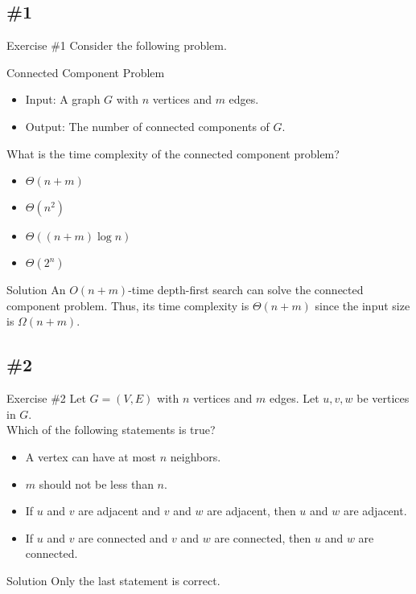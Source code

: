 \documentclass{beamer}
\begin{document}
\subsection{\#1}
\begin{frame}{Exercise \#1}
  Consider the following problem. \pause
  \begin{block}{Connected Component Problem}
    \begin{itemize}
      \item Input: A graph $G$ with $n$ vertices and $m$ edges.
      \item Output: The number of connected components of $G$.
    \end{itemize}
  \end{block}
  \pause
  What is the time complexity of the connected component problem?
  \begin{multicols}{2}
    \begin{itemize}
      \item $\Theta(n + m)$
      \item $\Theta(n^2)$
      \item $\Theta((n + m)\log n)$
      \item $\Theta(2^n)$ \pause
    \end{itemize}
  \end{multicols}
  \begin{block}{Solution}
    An $O(n + m)$-time depth-first search can solve the connected component
    problem.
    Thus, its time complexity is $\Theta(n + m)$ since the input size is
    $\Omega(n + m)$.
  \end{block}
\end{frame}

\subsection{\#2}
\begin{frame}{Exercise \#2}
  Let $G = (V, E)$ with $n$ vertices and $m$ edges.
  Let $u, v, w$ be vertices in $G$. \pause \\
  Which of the following statements is true? \pause
  \begin{itemize}
    \item A vertex can have at most $n$ neighbors. \pause
    \item $m$ should not be less than $n$. \pause
    \item If $u$ and $v$ are adjacent and $v$ and $w$ are adjacent, then
    $u$ and $w$ are adjacent. \pause
    \item If $u$ and $v$ are connected and $v$ and $w$ are connected, then
    $u$ and $w$ are connected. \pause
  \end{itemize}
  \begin{block}{Solution}
    Only the last statement is correct.
  \end{block}
\end{frame}
\end{document}
